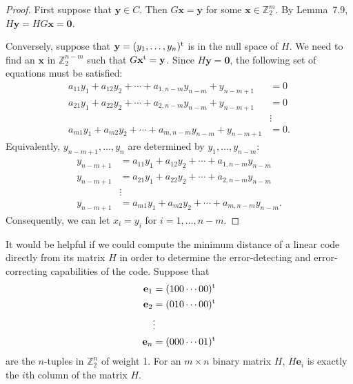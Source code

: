  
\begin{proof}
First suppose that ${\mathbf y} \in C$. Then $G {\mathbf x} = {\mathbf y}$
for some ${\mathbf x} \in {\mathbb Z}_2^m$. By Lemma~7.9, $H {\mathbf y} = HG
{\mathbf x} = {\mathbf 0}$. 
 
 
Conversely, suppose that ${\mathbf y} = (y_1, \ldots, y_n)^{\rm t}$ is
in the null space of $H$.  We need to find an ${\mathbf x}$ in ${\mathbb
Z}_2^{n-m}$ such that $G {\mathbf x}^{\rm t} = {\mathbf y}$. Since $H
{\mathbf y} = {\mathbf 0}$, the following set of equations must be
satisfied:  
\begin{align*}
a_{11} y_1 + a_{12} y_2 + \cdots + a_{1, n-m} y_{n-m} + y_{n-m+1}
& = 0 \\
a_{21} y_1 + a_{22} y_2 + \cdots + a_{2, n-m} y_{n-m} + y_{n-m+1}
& = 0 \\
& \vdots   \\
a_{m1} y_1 + a_{m2} y_2 + \cdots + a_{m, n-m} y_{n-m} + y_{n-m+1}
& = 0.
\end{align*}
Equivalently, $y_{n-m+1}, \ldots, y_n$ are determined by $y_1, \ldots,
y_{n-m}$: 
\begin{align*}
y_{n-m+1}
& = a_{11} y_1 + a_{12} y_2 + \cdots + a_{1, n-m} y_{n-m} \\
y_{n-m+1}
& = a_{21} y_1 + a_{22} y_2 + \cdots + a_{2, n-m} y_{n-m} \\
& \vdots \\
y_{n-m+1}
& = a_{m1} y_1 + a_{m2} y_2 + \cdots + a_{m, n-m} y_{n-m}.
\end{align*}
Consequently, we can let $x_i = y_i$ for $i= 1, \ldots, n - m$.
\end{proof}
 
 
\medskip
 
 
It would be helpful if we could compute the minimum distance of a
linear code directly from its matrix $H$ in order to determine the
error-detecting and error-correcting capabilities of the code. Suppose
that  
\begin{align*}
{\mathbf e}_1 & = (100 \cdots 00)^{\rm t} \\
{\mathbf e}_2 & = (010 \cdots 00)^{\rm t} \\
 & \vdots \\
{\mathbf e}_n & = (000 \cdots 01)^{\rm t}
\end{align*}
are the $n$-tuples in ${\mathbb Z}_2^n$ of weight 1. For an $m \times
n$ binary matrix $H$, $H{\mathbf e}_i$ is exactly the $i$th column of
the matrix $H$. 
 
